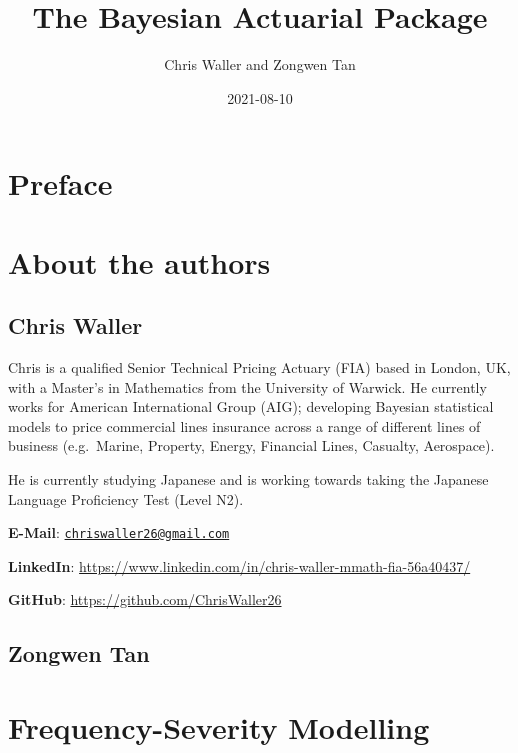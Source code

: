 \documentclass[
]{book}
\title{The Bayesian Actuarial Package}
\author{Chris Waller and Zongwen Tan}
\date{2021-08-10}
\begin{document}
\maketitle

{
\setcounter{tocdepth}{1}
\tableofcontents
}
\hypertarget{preface}{%
\chapter{Preface}\label{preface}}

\hypertarget{about-the-authors}{%
\chapter{About the authors}\label{about-the-authors}}

\hypertarget{chris-waller}{%
\section{Chris Waller}\label{chris-waller}}

Chris is a qualified Senior Technical Pricing Actuary (FIA) based in London, UK, with a Master's in Mathematics from the University of Warwick. He currently works for American International Group (AIG); developing Bayesian statistical models to price commercial lines insurance across a range of different lines of business (e.g.~Marine, Property, Energy, Financial Lines, Casualty, Aerospace).

He is currently studying Japanese and is working towards taking the Japanese Language Proficiency Test (Level N2).

\textbf{E-Mail}: \href{mailto:chriswaller26@gmail.com}{\nolinkurl{chriswaller26@gmail.com}}

\textbf{LinkedIn}: \url{https://www.linkedin.com/in/chris-waller-mmath-fia-56a40437/}

\textbf{GitHub}: \url{https://github.com/ChrisWaller26}

\hypertarget{zongwen-tan}{%
\section{Zongwen Tan}\label{zongwen-tan}}

\hypertarget{frequency-severity-modelling}{%
\chapter{Frequency-Severity Modelling}\label{frequency-severity-modelling}}
\end{document}
